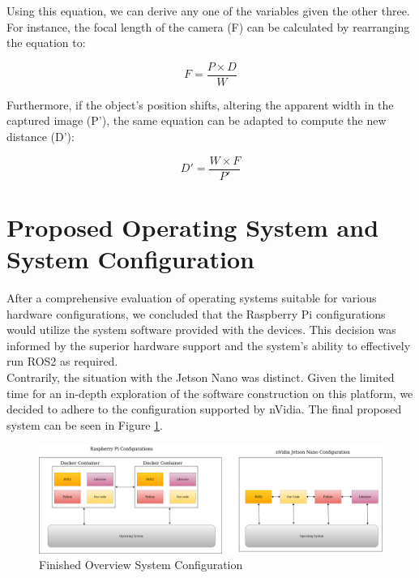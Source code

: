 Using this equation, we can derive any one of the variables given the other three. For instance, the focal length of the camera (F) can be calculated by rearranging the equation to:

\begin{equation}
F = \frac{P \times D}{W}
\end{equation}

Furthermore, if the object's position shifts, altering the apparent width in the captured image (P'), the same equation can be adapted to compute the new distance (D'):

\begin{equation}
D' = \frac{W \times F}{P'}
\end{equation}



\section{Proposed Operating System and System Configuration}

After a comprehensive evaluation of operating systems suitable for various hardware configurations, we concluded that the Raspberry Pi configurations would utilize the system software provided with the devices. This decision was informed by the superior hardware support and the system's ability to effectively run ROS2 as required.\\

Contrarily, the situation with the Jetson Nano was distinct. Given the limited time for an in-depth exploration of the software construction on this platform, we decided to adhere to the configuration supported by nVidia. The final proposed system can be seen in Figure \ref{fig:sysconf}.

\begin{figure}[H]
    \centering
    \includegraphics[scale=0.30]{fig/completeconfig.drawio.png}
    \caption{Finished Overview System Configuration}
    \label{fig:sysconf}
\end{figure}

\newpage

